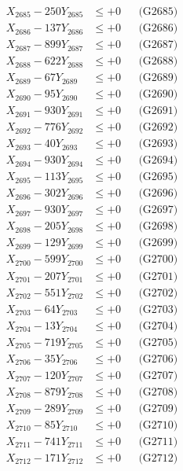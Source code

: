 \documentclass[a4paper,10pt]{article}
\begin{document}
{\begin{align}
X_{2685} - 250Y_{2685} &\leq +0 && \text{(G2685)} \\
X_{2686} - 137Y_{2686} &\leq +0 && \text{(G2686)} \\
X_{2687} - 899Y_{2687} &\leq +0 && \text{(G2687)} \\
X_{2688} - 622Y_{2688} &\leq +0 && \text{(G2688)} \\
X_{2689} - 67Y_{2689} &\leq +0 && \text{(G2689)} \\
X_{2690} - 95Y_{2690} &\leq +0 && \text{(G2690)} \\
\allowbreak
X_{2691} - 930Y_{2691} &\leq +0 && \text{(G2691)} \\
X_{2692} - 776Y_{2692} &\leq +0 && \text{(G2692)} \\
X_{2693} - 40Y_{2693} &\leq +0 && \text{(G2693)} \\
X_{2694} - 930Y_{2694} &\leq +0 && \text{(G2694)} \\
X_{2695} - 113Y_{2695} &\leq +0 && \text{(G2695)} \\
X_{2696} - 302Y_{2696} &\leq +0 && \text{(G2696)} \\
X_{2697} - 930Y_{2697} &\leq +0 && \text{(G2697)} \\
X_{2698} - 205Y_{2698} &\leq +0 && \text{(G2698)} \\
X_{2699} - 129Y_{2699} &\leq +0 && \text{(G2699)} \\
X_{2700} - 599Y_{2700} &\leq +0 && \text{(G2700)} \\
\allowbreak
X_{2701} - 207Y_{2701} &\leq +0 && \text{(G2701)} \\
X_{2702} - 551Y_{2702} &\leq +0 && \text{(G2702)} \\
X_{2703} - 64Y_{2703} &\leq +0 && \text{(G2703)} \\
X_{2704} - 13Y_{2704} &\leq +0 && \text{(G2704)} \\
X_{2705} - 719Y_{2705} &\leq +0 && \text{(G2705)} \\
X_{2706} - 35Y_{2706} &\leq +0 && \text{(G2706)} \\
X_{2707} - 120Y_{2707} &\leq +0 && \text{(G2707)} \\
X_{2708} - 879Y_{2708} &\leq +0 && \text{(G2708)} \\
X_{2709} - 289Y_{2709} &\leq +0 && \text{(G2709)} \\
X_{2710} - 85Y_{2710} &\leq +0 && \text{(G2710)} \\
\allowbreak
X_{2711} - 741Y_{2711} &\leq +0 && \text{(G2711)} \\
X_{2712} - 171Y_{2712} &\leq +0 && \text{(G2712)} \\

\end{align}}
\end{document}
